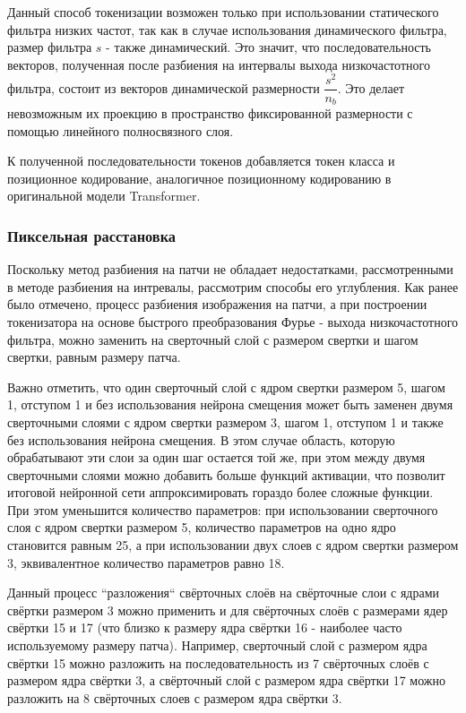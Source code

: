 \documentclass[times,specification,annotation]{itmo-student-thesis}
\begin{document}
Данный способ токенизации возможен только при использовании статического фильтра низких частот, так как в случае использования динамического фильтра, размер фильтра $s$ - также динамический. Это значит, что последовательность векторов, полученная после разбиения на интервалы выхода низкочастотного фильтра, состоит из векторов динамической размерности $\dfrac{s^2}{n_b}$. Это делает невозможным их проекцию в пространство фиксированной размерности с помощью линейного полносвязного слоя.

К полученной последовательности токенов добавляется токен класса и позиционное кодирование, аналогичное позиционному кодированию в оригинальной модели Transformer. 

\subsubsection{Пиксельная расстановка}
Поскольку метод разбиения на патчи не обладает недостатками, рассмотренными в методе разбиения на интревалы, рассмотрим способы его углубления. Как ранее было отмечено, процесс разбиения изображения на патчи, а при построении токенизатора на основе быстрого преобразования Фурье - выхода низкочастотного фильтра, можно заменить на сверточный слой с размером свертки и шагом свертки, равным размеру патча.

Важно отметить, что один сверточный слой с ядром свертки размером 5, шагом 1, отступом 1 и без использования нейрона смещения может быть заменен двумя сверточными слоями с ядром свертки размером 3, шагом 1, отступом 1 и также без использования нейрона смещения. В этом случае область, которую обрабатывают эти слои за один шаг остается той же, при этом между двумя сверточными слоями можно добавить больше функций активации, что позволит итоговой нейронной сети аппроксимировать гораздо более сложные функции. При этом уменьшится количество параметров: при использовании сверточного слоя с ядром свертки размером 5, количество параметров на одно ядро становится равным 25, а при использовании двух слоев с ядром свертки размером 3, эквивалентное количество параметров равно 18. 

Данный процесс ``разложения`` свёрточных слоёв на свёрточные слои с ядрами свёртки размером 3 можно применить и для свёрточных слоёв с размерами ядер свёртки 15 и 17 (что близко к размеру ядра свёртки 16 - наиболее часто используемому размеру патча). Например, сверточный слой с размером ядра свёртки 15 можно разложить на последовательность из 7 свёрточных слоёв с размером ядра свёртки 3, а свёрточный слой с размером ядра свёртки 17 можно разложить на 8 свёрточных слоев с размером ядра свёртки 3. 
\end{document}
